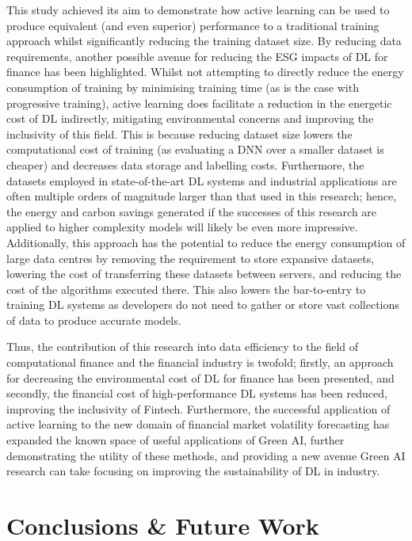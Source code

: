 \documentclass[a4paper, 11pt]{report}
\begin{document}
    This study achieved its aim to demonstrate how active learning can be used to produce equivalent (and even superior) performance to a traditional training approach whilst significantly reducing the training dataset size. By reducing data requirements, another possible avenue for reducing the ESG impacts of DL for finance has been highlighted. Whilst not attempting to directly reduce the energy consumption of training by minimising training time (as is the case with progressive training), active learning does facilitate a reduction in the energetic cost of DL indirectly, mitigating environmental concerns and improving the inclusivity of this field. This is because reducing dataset size lowers the computational cost of training (as evaluating a DNN over a smaller dataset is cheaper) and decreases data storage and labelling costs. Furthermore, the datasets employed in state-of-the-art DL systems and industrial applications are often multiple orders of magnitude larger than that used in this research; hence, the energy and carbon savings generated if the successes of this research are applied to higher complexity models will likely be even more impressive. Additionally, this approach has the potential to reduce the energy consumption of large data centres by removing the requirement to store expansive datasets, lowering the cost of transferring these datasets between servers, and reducing the cost of the algorithms executed there. This also lowers the bar-to-entry to training DL systems as developers do not need to gather or store vast collections of data to produce accurate models. 
    
    Thus, the contribution of this research into data efficiency to the field of computational finance and the financial industry is twofold; firstly, an approach for decreasing the environmental cost of DL for finance has been presented, and secondly, the financial cost of high-performance DL systems has been reduced, improving the inclusivity of Fintech. Furthermore, the successful application of active learning to the new domain of financial market volatility forecasting has expanded the known space of useful applications of Green AI, further demonstrating the utility of these methods, and providing a new avenue Green AI research can take focusing on improving the sustainability of DL in industry.


    \newpage
    \chapter{Conclusions \& Future Work}
    \label{chapter: conclusion}
\end{document}
